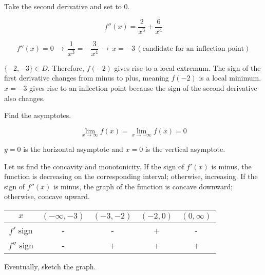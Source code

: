 \documentclass{article}
\begin{document}
\hfill

\noindent Take the second derivative and set to 0.

\begin{equation*}f''(x) = \frac{2}{x^3} + \frac{6}{x^4}\end{equation*}

\begin{equation*}f''(x) = 0\,\rightarrow\,\frac{1}{x^3} = -\frac{3}{x^4}\,\rightarrow\,x = -3\, (\text{candidate for an inflection point})\end{equation*}

\hfill

\noindent  $\{-2, -3\} \in D$. Therefore, $f(-2)$ gives rise to a local extremum. The sign of the first derivative changes from minus to plus, meaning $f(-2)$ is a local minimum. $x=-3$ gives rise to an inflection point because the sign of the second derivative also changes.

\hfill

\noindent Find the asymptotes.

\begin{equation*}\lim_{x\to\infty} f(x) = \lim_{x\to-\infty} f(x) = 0\end{equation*}

\hfill

\noindent $y=0$ is the horizontal asymptote and $x=0$ is the vertical asymptote.

\hfill

\noindent Let us find the concavity and monotonicity. If the sign of $f'(x)$ is minus, the function is decreasing on the corresponding interval; otherwise, increasing. If the sign of $f''(x)$ is minus, the graph of the function is concave downward; otherwise, concave upward.

\begin{center}
    \large
    \begin{tabular}{ |c| c c c c| } 
    \hline
        $x$ & $(-\infty, -3)$ & $(-3, -2)$ & $(-2, 0)$ &  $(0, \infty)$ \\
        \hline
        $f'$ sign & - & - & + & - \\
        \hline
        $f''$ sign & - & + & + & + \\
        \hline
    \end{tabular}
\end{center}

\hfill

\noindent Eventually, sketch the graph.
\end{document}
